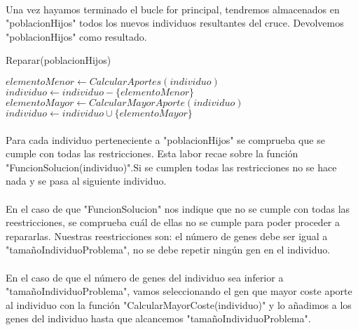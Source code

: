 	\paragraph{}Una vez hayamos terminado el bucle for principal, tendremos almacenados en "poblacionHijos" todos los nuevos individuos resultantes del cruce. Devolvemos "poblacionHijos" como resultado.

	\begin{algorithm}[H]
		\caption{Reparar(poblacionHijos)}
		\begin{algorithmic}
			
			\STATE $elementoMenor \leftarrow CalcularAportes(individuo)$
			\STATE $individuo \leftarrow individuo-\{elementoMenor\}$
			\ENDWHILE
			\STATE $elementoMayor \leftarrow CalcularMayorAporte(individuo)$
			\STATE $individuo \leftarrow individuo\cup\{elementoMayor\}$
			\ENDIF
			\ENDIF
			\ENDFOR
		\end{algorithmic}
	\end{algorithm}

	\paragraph{}Para cada individuo perteneciente a "poblacionHijos" se comprueba que se cumple con todas las restricciones. Esta labor recae sobre la función "FuncionSolucion(individuo)".Si se cumplen todas las restricciones no se hace nada y se pasa al siguiente individuo.
	
	\paragraph{}En el caso de que "FuncionSolucion" nos indique que no se cumple con todas las reestricciones, se comprueba cuál de ellas no se cumple para poder proceder a repararlas.
	Nuestras reestricciones son: el número de genes debe ser igual a "tamañoIndividuoProblema", no se debe repetir ningún gen en el individuo.
	
	\paragraph{}En el caso de que el número de genes del individuo sea inferior a "tamañoIndividuoProblema", vamos seleccionando el gen que mayor coste aporte al individuo con la función "CalcularMayorCoste(individuo)" y lo añadimos a los genes del individuo hasta que alcancemos "tamañoIndividuoProblema".
	

